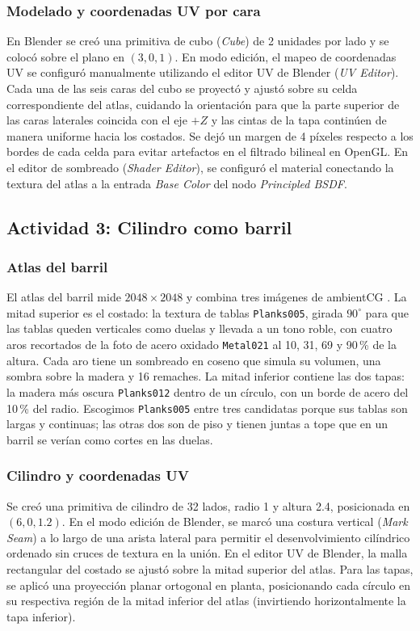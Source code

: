 \subsubsection{Modelado y coordenadas UV por cara}
En Blender se creó una primitiva de cubo (\textit{Cube}) de 2 unidades por lado y se colocó sobre el plano en $(3, 0, 1)$. En modo edición, el mapeo de coordenadas UV se configuró manualmente utilizando el editor UV de Blender (\textit{UV Editor}). Cada una de las seis caras del cubo se proyectó y ajustó sobre su celda correspondiente del atlas, cuidando la orientación para que la parte superior de las caras laterales coincida con el eje $+Z$ y las cintas de la tapa continúen de manera uniforme hacia los costados. Se dejó un margen de 4 píxeles respecto a los bordes de cada celda para evitar artefactos en el filtrado bilineal en OpenGL. En el editor de sombreado (\textit{Shader Editor}), se configuró el material conectando la textura del atlas a la entrada \textit{Base Color} del nodo \textit{Principled BSDF}.

\subsection{Actividad 3: Cilindro como barril}

\subsubsection{Atlas del barril}
El atlas del barril mide $2048 \times 2048$ y combina tres imágenes de ambientCG \cite{ambientcg}. La mitad superior es el costado: la textura de tablas \texttt{Planks005}, girada $90^\circ$ para que las tablas queden verticales como duelas y llevada a un tono roble, con cuatro aros recortados de la foto de acero oxidado \texttt{Metal021} al 10, 31, 69 y 90\,\% de la altura. Cada aro tiene un sombreado en coseno que simula su volumen, una sombra sobre la madera y 16 remaches. La mitad inferior contiene las dos tapas: la madera más oscura \texttt{Planks012} dentro de un círculo, con un borde de acero del 10\,\% del radio. Escogimos \texttt{Planks005} entre tres candidatas porque sus tablas son largas y continuas; las otras dos son de piso y tienen juntas a tope que en un barril se verían como cortes en las duelas.

\subsubsection{Cilindro y coordenadas UV}
Se creó una primitiva de cilindro de 32 lados, radio 1 y altura 2.4, posicionada en $(6, 0, 1.2)$. En el modo edición de Blender, se marcó una costura vertical (\textit{Mark Seam}) a lo largo de una arista lateral para permitir el desenvolvimiento cilíndrico ordenado sin cruces de textura en la unión. En el editor UV de Blender, la malla rectangular del costado se ajustó sobre la mitad superior del atlas. Para las tapas, se aplicó una proyección planar ortogonal en planta, posicionando cada círculo en su respectiva región de la mitad inferior del atlas (invirtiendo horizontalmente la tapa inferior).

